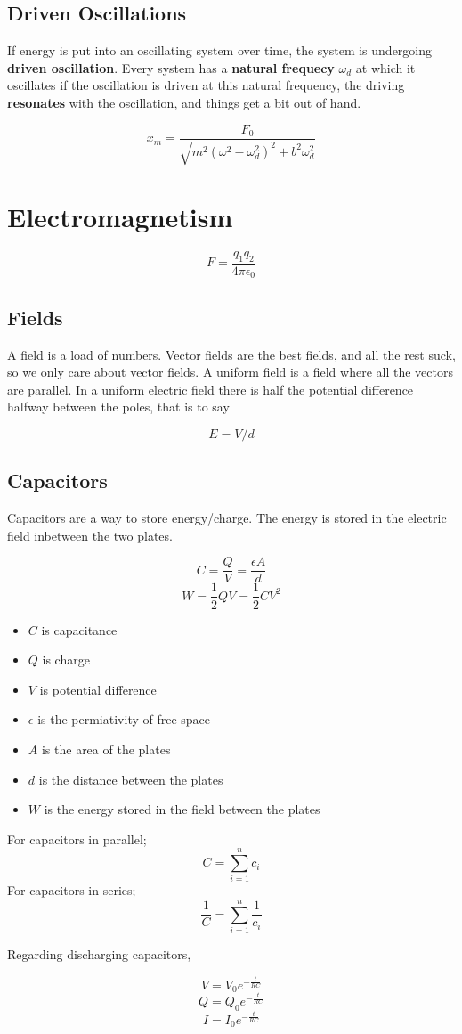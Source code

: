 \documentclass{article}
\begin{document}
\subsection{Driven Oscillations}
If energy is put into an oscillating system over time, the system is undergoing \textbf{driven oscillation}. Every system has a \textbf{natural frequecy} $\omega_d$ at which it oscillates if the oscillation is driven at this natural frequency, the driving \textbf{resonates} with the oscillation, and things get a bit out of hand.

\[x_m=\frac{F_0}{\sqrt{m^2\left(\omega^2-\omega_d^2\right)^2+b^2\omega_d^2}}\]

\section{Electromagnetism}

\[F=\frac{q_1q_2}{4\pi\epsilon_0}\]

\subsection{Fields}

A field is a load of numbers. Vector fields are the best fields, and all the rest suck, so we only care about vector fields. A uniform field is a field where all the vectors are parallel. In a uniform electric field there is half the potential difference halfway between the poles, that is to say

\[E=V/d\]

\subsection{Capacitors}


Capacitors are a way to store energy/charge. The energy is stored in the electric field inbetween the two plates.

\[C=\frac{Q}{V}=\frac{\epsilon A}{d}\]
\[W=\frac{1}{2}QV=\frac{1}{2}CV^2\]

\begin{itemize}
	\item $C$ is capacitance
	\item $Q$ is charge
	\item $V$ is potential difference
	\item $\epsilon$ is the permiativity of free space
	\item $A$ is the area of the plates
	\item $d$ is the distance between the plates
	\item $W$ is the energy stored in the field between the plates
\end{itemize}

\noindent For capacitors in parallel;
\[C=\sum_{i=1}^nc_i\]
\noindent For capacitors in series;
\[\frac{1}{C}=\sum_{i=1}^n\frac{1}{c_i}\]

\noindent Regarding discharging capacitors,

\[V=V_0e^{-\frac{t}{RC}}\]
\[Q=Q_0e^{-\frac{t}{RC}}\]
\[I=I_0e^{-\frac{t}{RC}}\]
\end{document}
